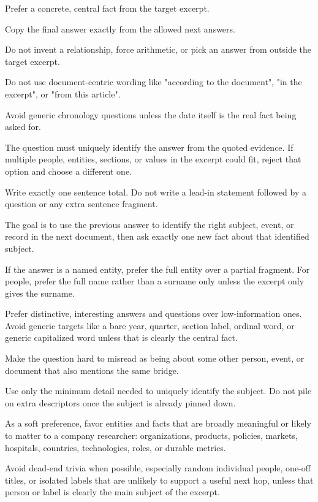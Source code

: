 \begin{tcolorbox}
\begin{scriptsize}
Prefer a concrete, central fact from the target excerpt.\par
Copy the final answer exactly from the allowed next answers.\par
Do not invent a relationship, force arithmetic, or pick an answer from outside the target excerpt.\par
Do not use document-centric wording like "according to the document", "in the excerpt", or "from this article".\par
Avoid generic chronology questions unless the date itself is the real fact being asked for.\par
The question must uniquely identify the answer from the quoted evidence. If multiple people, entities, sections, or values in the excerpt could fit, reject that option and choose a different one.\par
Write exactly one sentence total. Do not write a lead-in statement followed by a question or any extra sentence fragment.\par
The goal is to use the previous answer to identify the right subject, event, or record in the next document, then ask exactly one new fact about that identified subject.\par
If the answer is a named entity, prefer the full entity over a partial fragment. For people, prefer the full name rather than a surname only unless the excerpt only gives the surname.\par
Prefer distinctive, interesting answers and questions over low-information ones. Avoid generic targets like a bare year, quarter, section label, ordinal word, or generic capitalized word unless that is clearly the central fact.\par
Make the question hard to misread as being about some other person, event, or document that also mentions the same bridge.\par
Use only the minimum detail needed to uniquely identify the subject. Do not pile on extra descriptors once the subject is already pinned down.\par
As a soft preference, favor entities and facts that are broadly meaningful or likely to matter to a company researcher: organizations, products, policies, markets, hospitals, countries, technologies, roles, or durable metrics.\par
Avoid dead-end trivia when possible, especially random individual people, one-off titles, or isolated labels that are unlikely to support a useful next hop, unless that person or label is clearly the main subject of the excerpt.\par

\end{scriptsize}
\end{tcolorbox}
